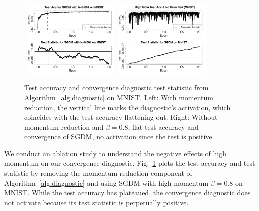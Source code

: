 \documentclass[conference]{IEEEtran}
\begin{document}
\begin{figure}[ht]
\mbox{\hspace{-0.1in}
\includegraphics[width=1.82in]{fig/RFig3_Stat.pdf}\hspace{-0.05in}
  \includegraphics[width=1.82in]{fig/RFig6_ablation.pdf}
}
\vspace{-0.2in}
  \caption{Test accuracy and convergence diagnostic test statistic from Algorithm~\ref{alg:diagnostic} on MNIST. 
Left: With momentum reduction, the vertical line marks the diagnostic's activation, which coincides with the test accuracy flattening out.  
Right: Without momentum reduction and $\beta = 0.8$, flat test accuracy and convergence of SGDM, no activation since the test is positive.
  }
\label{fig:mnist_ablation}\vspace{-0.1in}
\end{figure}

We conduct an ablation study to understand the negative effects of high momentum on our convergence diagnostic.
Fig.~\ref{fig:mnist_ablation} plots the test accuracy and test statistic by removing the momentum reduction component of Algorithm~\ref{alg:diagnostic} and using SGDM with high momentum $\beta = 0.8$ on MNIST. 
While the test accuracy has plateaued, the convergence diagnostic does not activate because its test statistic is perpetually positive.
\end{document}
